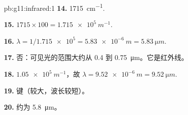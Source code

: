 \begin{solution}{pb:g11:infrared:1}
\textbf{14.} \qty{1715}{cm^{-1}}.

\textbf{15.} $1715 \times 100 = \qty{1.715e5}{m^{-1}}$.

\textbf{16.} $\lambda = 1/\num{1.715e5} = \qty{5.83e-6}{m} =
\qty{5.83}{\micro m}$.

\textbf{17.} 否：可见光的范围大约从 0.4 到
\qty{0.75}{\micro m}。它是红外线。

\textbf{18.} $\num{1.05e5}\ \si{m^{-1}}$，故 $\lambda = \qty{9.52e-6}{m}
= \qty{9.52}{\micro m}$.

\textbf{19.}  键（较大，波长较短）。

\textbf{20.} 约为 \qty{5.8}{\micro m}。
\end{solution}
